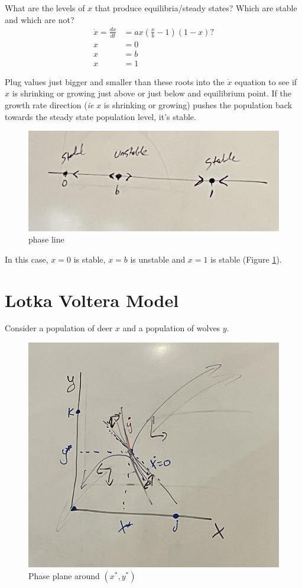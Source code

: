 \documentclass{article}
\begin{document}
What are the levels of $x$ that produce equilibria/steady states? Which are stable and which are not?
\begin{align*}
    \dot x = \frac{dx}{dt} &= ax (\frac{x}{b} -1)(1-x)?\\
    x &= 0\\
    x &= b \\
    x &= 1
\end{align*}

Plug values just bigger and smaller than these roots into the $\dot x$ equation to see if $x$ is shrinking or growing just above or just below and equilibrium point. If the growth rate direction (\textit{ie} $x$ is shrinking or growing) pushes the population back towards the steady state population level, it's stable. \\

\begin{figure}[htp]
    \centering
    \includegraphics[width=0.5\linewidth]{Screen Shot 2023-11-15 at 11.03.06 AM.png}
    \caption{phase line}
    \label{fig:one}
\end{figure}

In this case, $x=0$ is stable, $x=b$ is unstable and $x =1$ is stable (Figure \ref{fig:one}).

\section{Lotka Voltera Model}

Consider a population of deer $x$ and a population of wolves $y$. \\

\begin{figure}[htp]
    \centering
    \includegraphics[width=0.5\linewidth]{Screen Shot 2023-11-15 at 11.22.55 AM.png}
    \caption{Phase plane around $(x^*, y^*)$}
    \label{fig:pset1}
\end{figure}
\end{document}
